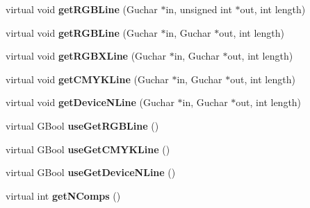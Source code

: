 \begin{DoxyCompactItemize}
\item 
\mbox{\label{class_gfx_i_c_c_based_color_space_a786606dbe6c2c1d9f0b6b3fb4cf4949d}} 
virtual void {\bfseries get\+R\+G\+B\+Line} (Guchar $\ast$in, unsigned int $\ast$out, int length)
\item 
\mbox{\label{class_gfx_i_c_c_based_color_space_a565a0cce5c1464f8524c7825936a45ef}} 
virtual void {\bfseries get\+R\+G\+B\+Line} (Guchar $\ast$in, Guchar $\ast$out, int length)
\item 
\mbox{\label{class_gfx_i_c_c_based_color_space_a359335460a6e7da26efc82f47df8a32e}} 
virtual void {\bfseries get\+R\+G\+B\+X\+Line} (Guchar $\ast$in, Guchar $\ast$out, int length)
\item 
\mbox{\label{class_gfx_i_c_c_based_color_space_addb67edfbc30c0b8204a238d3e7f0595}} 
virtual void {\bfseries get\+C\+M\+Y\+K\+Line} (Guchar $\ast$in, Guchar $\ast$out, int length)
\item 
\mbox{\label{class_gfx_i_c_c_based_color_space_ac85eeae99df2a17e468458a107e4b3f0}} 
virtual void {\bfseries get\+Device\+N\+Line} (Guchar $\ast$in, Guchar $\ast$out, int length)
\item 
\mbox{\label{class_gfx_i_c_c_based_color_space_a74f3e8504a2878d4deadfb9bee7599ae}} 
virtual G\+Bool {\bfseries use\+Get\+R\+G\+B\+Line} ()
\item 
\mbox{\label{class_gfx_i_c_c_based_color_space_a0ed7bf6eb9aa4c96857ac35f7d844e6f}} 
virtual G\+Bool {\bfseries use\+Get\+C\+M\+Y\+K\+Line} ()
\item 
\mbox{\label{class_gfx_i_c_c_based_color_space_ab31b5e6e625f5a1064e1f48b15357abf}} 
virtual G\+Bool {\bfseries use\+Get\+Device\+N\+Line} ()
\item 
\mbox{\label{class_gfx_i_c_c_based_color_space_ab6a5fa2bcc5a6f093cf1e34b8ce267f1}} 
virtual int {\bfseries get\+N\+Comps} ()
\item 

\end{DoxyCompactItemize}
